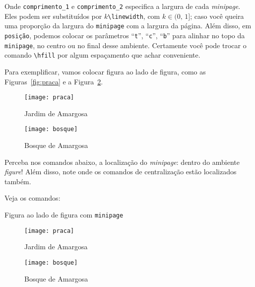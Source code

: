 Onde \texttt{comprimento\_1} e \texttt{comprimento\_2} especifica a largura de 
cada \textit{minipage}.
Eles podem ser substituídos por \texttt{$k$\textbackslash linewidth}, com 
$k\in(0,\,1]$; caso você queira uma proporção da largura do \texttt{minipage} 
com a largura da página.
Além disso, em \texttt{posição}, podemos colocar os parâmetros ``\texttt{t}'', 
``\texttt{c}'', ``\texttt{b}'' para alinhar no topo da \texttt{minipage}, no 
centro ou no final desse ambiente.
Certamente você pode trocar o comando \Verb|\hfill| por algum espaçamento que 
achar conveniente.

Para exemplificar, vamos colocar figura ao lado de figura, como as Figuras~\ref{fig:praca} e
a Figura~\ref{fig:bosque}.

\begin{figure}[!htbp]
	\begin{minipage}[b]{0.45\linewidth}
	\centering
	\texttt{[image: praca]}
	\caption{Jardim de Amargosa}
	\label{fig:praca}
	\end{minipage}
	\hfill
	\begin{minipage}[b]{0.45\linewidth}
	\centering
	\texttt{[image: bosque]}
	\caption{Bosque de Amargosa}
	\label{fig:bosque}
	\end{minipage}
\end{figure}

Perceba nos comandos abaixo, a localização do \textit{minipage}: dentro do 
ambiente \textit{figure}!
Além disso, note onde os comandos de centralização estão localizados também.

Veja os comandos:

\begin{codigo}{Figura ao lado de figura com \texttt{minipage}}{\lapis}
\begin{figure}[!htbp]
	\begin{minipage}[b]{0.45\linewidth}
	\centering
	\texttt{[image: praca]}
	\caption{Jardim de Amargosa}
	\label{fig:praca}
	\end{minipage}
	\hfill
	\begin{minipage}[b]{0.45\linewidth}
	\centering
	\texttt{[image: bosque]}
	\caption{Bosque de Amargosa}
	\label{fig:bosque}
	\end{minipage}
\end{figure}
\end{codigo}

\newpage